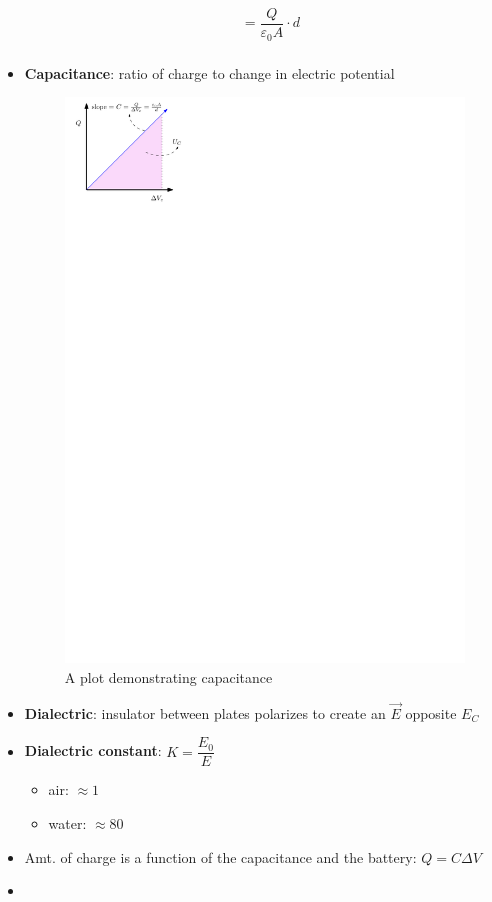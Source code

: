 \documentclass{article}
\begin{document}
\begin{itemize}
\begin{align*}
           &=\dfrac{Q}{\varepsilon_0 A}\cdot d\\
        \end{align*} 
      \item \textbf{Capacitance}: ratio of charge to change in electric potential
        \begin{figure}[H]
          \centering
          \includegraphics{figures/capacitance-graph.pdf}
          \caption{A plot demonstrating capacitance}
        \end{figure}
      \item \textbf{Dialectric}: insulator between plates polarizes to create an $\vec{E}$ opposite $E_C$
      \item \textbf{Dialectric constant}: $K=\dfrac{E_0}{E}$
        \begin{itemize}
          \item air: $\approx1$
          \item water: $\approx80$
        \end{itemize}
      \item Amt. of charge is a function of the capacitance and the battery: $Q=C\Delta V$
      \item 
    \end{itemize}
\end{document}
